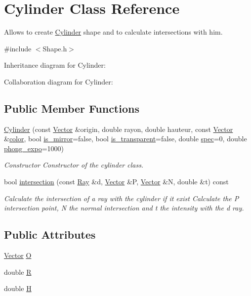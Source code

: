 \hypertarget{classCylinder}{}\section{Cylinder Class Reference}
\label{classCylinder}


Allows to create \hyperlink{classCylinder}{Cylinder} shape and to calculate intersections with him.  




{\ttfamily \#include $<$Shape.\+h$>$}



Inheritance diagram for Cylinder\+:


Collaboration diagram for Cylinder\+:
\subsection*{Public Member Functions}
\begin{DoxyCompactItemize}
\item 
\hyperlink{classCylinder_a54ef9e82a556bb980a2147fbee3612b3}{Cylinder} (const \hyperlink{classVector}{Vector} \&origin, double rayon, double hauteur, const \hyperlink{classVector}{Vector} \&\hyperlink{classShape_adb97857c268315aed7861e5204c2485b}{color}, bool \hyperlink{classShape_a0ead7657fa5e4c7862fe1cedd670a9e5}{is\+\_\+mirror}=false, bool \hyperlink{classShape_ab8da3fc4606e66dea941ec23d25f53ef}{is\+\_\+transparent}=false, double \hyperlink{classShape_a60ef96ac5dea3478fdd1ab320e4c3bef}{spec}=0, double \hyperlink{classShape_a2556fca106f9503e6dfb4da703c28f7f}{phong\+\_\+expo}=1000)
\begin{DoxyCompactList}\small\item\em Constructor Constructor of the cylinder class. \end{DoxyCompactList}\item 
bool \hyperlink{classCylinder_a0f3c6cca45e3efa5250dc45ebcff81e5}{intersection} (const \hyperlink{classRay}{Ray} \&d, \hyperlink{classVector}{Vector} \&P, \hyperlink{classVector}{Vector} \&N, double \&t) const
\begin{DoxyCompactList}\small\item\em Calculate the intersection of a ray with the cylinder if it exist Calculate the P intersection point, N the normal intersection and t the intensity with the d ray. \end{DoxyCompactList}\end{DoxyCompactItemize}
\subsection*{Public Attributes}
\begin{DoxyCompactItemize}
\item 
\hyperlink{classVector}{Vector} \hyperlink{classCylinder_a3093b8b66a4194d086cbb6cf700bc32a}{O}
\item 
double \hyperlink{classCylinder_a8f4587554355f2a79614f639034f8aaf}{R}
\item 
double \hyperlink{classCylinder_a5774701442d53c43081cae48bd99147c}{H}
\end{DoxyCompactItemize}


